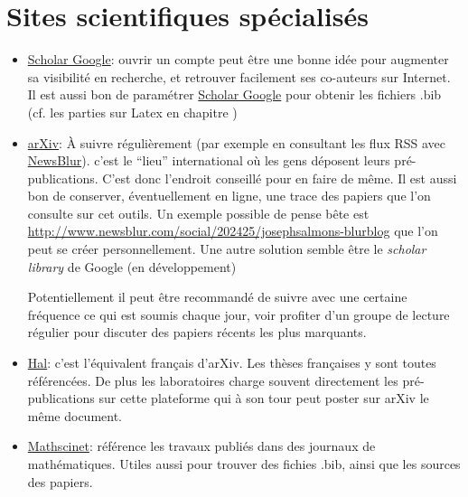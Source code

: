 \section{Sites scientifiques spécialisés}



\begin{itemize}
\item \href{http://scholar.google.com}{Scholar Google}:
ouvrir un compte peut être une bonne idée pour augmenter sa visibilité en recherche,
et retrouver facilement ses co-auteurs sur Internet.
Il est aussi bon de paramétrer \href{http://scholar.google.com}{Scholar Google} pour
obtenir les fichiers  .bib (cf. les parties sur Latex en chapitre )

\item \href{http://arxiv.org/}{arXiv}:
À suivre régulièrement (par exemple en consultant les flux RSS avec 
\href{https://www.newsblur.com/}{NewsBlur}). 
c'est le ``lieu'' international
où les gens déposent leurs pré-publications. C'est donc l'endroit conseillé pour en faire
de même. Il est aussi bon de conserver, éventuellement en ligne, une trace des papiers que
l'on consulte sur cet outils. Un exemple possible de pense bête est 
\href{http://www.newsblur.com/social/202425/josephsalmons-blurblog}
{http://www.newsblur.com/social/202425/josephsalmons-blurblog}
que l'on peut se créer personnellement. Une autre solution semble \^etre 
le \textit{scholar library} de Google
(en développement)


Potentiellement il peut être recommandé de suivre avec une certaine fréquence ce qui est soumis
chaque jour, voir profiter d'un groupe de lecture régulier pour discuter des papiers récents les plus
marquants.

\item \href{http://hal.archives-ouvertes.fr/}{Hal}: c'est l'équivalent français d'arXiv.
Les thèses françaises y sont toutes référencées. De plus les laboratoires charge souvent directement
les pré-publications sur cette plateforme qui \`a son tour peut poster sur arXiv le m\^eme document.


\item \href{http://www.ams.org/mathscinet/}{Mathscinet}: référence les travaux publiés dans
des journaux de mathématiques. Utiles aussi pour trouver des fichies .bib, ainsi que les sources
des papiers. 

\end{itemize}


